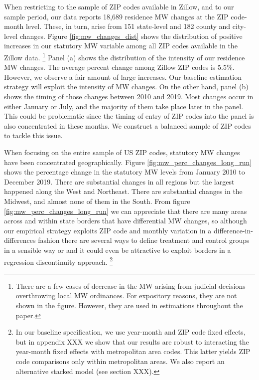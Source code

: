 When restricting to the sample of ZIP codes available in Zillow, and to our 
sample period, our data reports 18,689 residence MW changes at the ZIP code-month 
level.
These, in turn, arise from 151 state-level and 182 county and city-level changes.
Figure \ref{fig:mw_changes_dist} shows the distribution of positive increases in
our statutory MW variable among all ZIP codes available in the Zillow data.%
\footnote{There are a few cases of decrease in the MW arising from judicial 
decisions overthrowing local MW ordinances.
For expository reasons, they are not shown in the figure.
However, they are used in estimations throughout the paper.} 
%
%
Panel (a) shows the distribution of the intensity of our residence MW changes. The average percent 
change among Zillow ZIP codes is 5.5\%.
However, we observe a fair amount of large increases.
Our baseline estimation strategy will exploit the intensity of MW changes.
On the other hand, panel (b) shows the timing of those changes between 2010 and 
2019.
Most changes occur in either January or July, and the majority of them take 
place later in the panel.
This could be problematic since the timing of entry of ZIP codes into the panel 
is also concentrated in these months.
We construct a balanced sample of ZIP codes to tackle this issue.

When focusing on the entire sample of US ZIP codes, statutory MW changes have 
been concentrated geographically.
Figure \ref{fig:mw_perc_changes_long_run} shows the percentage change in the 
statutory MW levels from January 2010 to December 2019.
There are substantial changes in all regions but the largest happened along the
West and Northeast.
There are substantial changes in the Midwest, and almost none of them in the 
South.
From figure \ref{fig:mw_perc_changes_long_run} we can appreciate that there are
many areas across and within state borders that have differential MW changes,
so although our empirical strategy exploits ZIP code and monthly variation in a
difference-in-differences fashion there are several ways to define treatment and
control groups in a sensible way or and it could even be attractive to exploit
borders in a regression discontinuity approach.%
\footnote{In our baseline specification, we use year-month and ZIP code fixed 
effects, but in appendix XXX we show that our results are robust to interacting 
the year-month fixed effects with metropolitan area codes.
This latter yields ZIP code comparisons only within metropolitan areas.
We also report an alternative stacked model (see section XXX).} 

